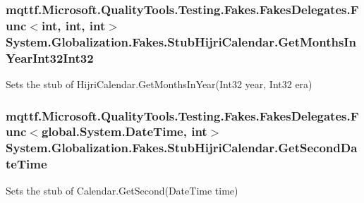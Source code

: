 \hypertarget{class_system_1_1_globalization_1_1_fakes_1_1_stub_hijri_calendar_a0c9698322f0c20b19dcdadb5e2099b21}{
\subsubsection[{Get\-Months\-In\-Year\-Int32\-Int32}]{\setlength{\rightskip}{0pt plus 5cm}mqttf.\-Microsoft.\-Quality\-Tools.\-Testing.\-Fakes.\-Fakes\-Delegates.\-Func$<$int, int, int$>$ System.\-Globalization.\-Fakes.\-Stub\-Hijri\-Calendar.\-Get\-Months\-In\-Year\-Int32\-Int32}}\label{class_system_1_1_globalization_1_1_fakes_1_1_stub_hijri_calendar_a0c9698322f0c20b19dcdadb5e2099b21}


Sets the stub of Hijri\-Calendar.\-Get\-Months\-In\-Year(\-Int32 year, Int32 era)

\hypertarget{class_system_1_1_globalization_1_1_fakes_1_1_stub_hijri_calendar_aac3a5f3d7cd89eb576ad259e11b90ec4}{
\subsubsection[{Get\-Second\-Date\-Time}]{\setlength{\rightskip}{0pt plus 5cm}mqttf.\-Microsoft.\-Quality\-Tools.\-Testing.\-Fakes.\-Fakes\-Delegates.\-Func$<$global.\-System.\-Date\-Time, int$>$ System.\-Globalization.\-Fakes.\-Stub\-Hijri\-Calendar.\-Get\-Second\-Date\-Time}}\label{class_system_1_1_globalization_1_1_fakes_1_1_stub_hijri_calendar_aac3a5f3d7cd89eb576ad259e11b90ec4}


Sets the stub of Calendar.\-Get\-Second(\-Date\-Time time)

